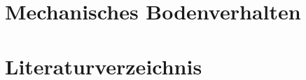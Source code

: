 \documentclass[hyperref={pdfpagemode=FullScreen, colorlinks=false}]{beamer}
\begin{document}
\maketitle

\section{Mechanisches Bodenverhalten}






\section*{Literaturverzeichnis}

\begin{frame}[allowframebreaks]{}
	\printbibliography
\end{frame}
\end{document}
